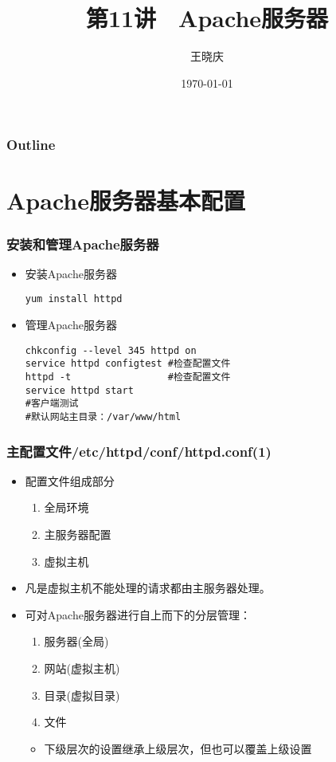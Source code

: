 \documentclass[xcolor=svgnames,presentation]{beamer}
\title{第11讲　Apache服务器}
\author{王晓庆}
\date{\today}
\institute{wangxiaoqing@outlook.com}
\begin{document}
\maketitle

\begin{frame}
\frametitle{Outline}
\setcounter{tocdepth}{1}
\tableofcontents
\end{frame}
\section{Apache服务器基本配置}
\label{sec-1}
\begin{frame}[fragile]
\frametitle{安装和管理Apache服务器}
\label{sec-1-1}
\begin{itemize}

\item 安装Apache服务器\\
\label{sec-1-1-1}%
\begin{verbatim}
yum install httpd
\end{verbatim}

\item 管理Apache服务器\\
\label{sec-1-1-2}%
\begin{verbatim}
chkconfig --level 345 httpd on
service httpd configtest #检查配置文件
httpd -t                 #检查配置文件
service httpd start
#客户端测试
#默认网站主目录：/var/www/html
\end{verbatim}
\end{itemize} %
\end{frame}
\begin{frame}
\frametitle{主配置文件/etc/httpd/conf/httpd.conf(1)}
\label{sec-1-2}
\begin{itemize}

\item 配置文件组成部分
\label{sec-1-2-1}%
\begin{enumerate}
\item 全局环境
\item 主服务器配置
\item 虚拟主机
\end{enumerate}

\item 凡是虚拟主机不能处理的请求都由主服务器处理。
\label{sec-1-2-2}%

\item 可对Apache服务器进行自上而下的分层管理：
\label{sec-1-2-3}%
\begin{enumerate}
\item 服务器(全局)
\item 网站(虚拟主机)
\item 目录(虚拟目录)
\item 文件
\end{enumerate}
\begin{itemize}

\item 下级层次的设置继承上级层次，但也可以覆盖上级设置
\label{sec-1-2-3-1}%
\end{itemize} %
\end{itemize} %
\end{frame}
\end{document}
